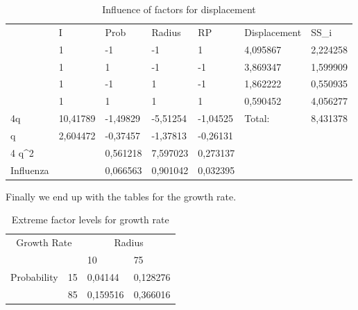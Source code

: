 \begin{table}[H]
\centering
\begin{tabular}{l|l|l|l|l|ll}
\cline{2-7}
 & I & Prob & Radius & RP & \multicolumn{1}{l|}{Displacement} & \multicolumn{1}{l|}{SS\_i} \\ \cline{2-7} 
 & 1 & -1 & -1 & 1 & \multicolumn{1}{l|}{4,095867} & \multicolumn{1}{l|}{2,224258} \\ \cline{2-7} 
 & 1 & 1 & -1 & -1 & \multicolumn{1}{l|}{3,869347} & \multicolumn{1}{l|}{1,599909} \\ \cline{2-7} 
 & 1 & -1 & 1 & -1 & \multicolumn{1}{l|}{1,862222} & \multicolumn{1}{l|}{0,550935} \\ \cline{2-7} 
 & 1 & 1 & 1 & 1 & \multicolumn{1}{l|}{0,590452} & \multicolumn{1}{l|}{4,056277} \\ \hline \multicolumn{1}{|l|}{4q} & 10,41789 & -1,49829 & -5,51254 & -1,04525 & \multicolumn{1}{l|}{Total:} & \multicolumn{1}{l|}{8,431378} \\ \hline
\multicolumn{1}{|l|}{q} & 2,604472 & -0,37457 & -1,37813 & -0,26131 &  &  \\ \cline{1-5}
\multicolumn{1}{|l|}{4 q\textasciicircum{}2} &  & 0,561218 & 7,597023 & 0,273137 &  &  \\ \cline{1-5}
\multicolumn{1}{|l|}{Influenza} &  & 0,066563 & 0,901042 & 0,032395 &  &  \\ \cline{1-5}
\end{tabular}
\caption{Influence of factors for displacement}
\end{table}

Finally we end up with the tables for the growth rate.

\begin{table}[H]
\centering
\begin{tabular}{|cl|ll|}
\hline
\multicolumn{2}{|c|}{\multirow{2}{*}{Growth Rate}} & \multicolumn{2}{c|}{Radius} \\ \cline{3-4} 
\multicolumn{2}{|c|}{} & \multicolumn{1}{l|}{10} & 75 \\ \hline
\multicolumn{1}{|c|}{\multirow{2}{*}{Probability}} & 15 & \multicolumn{1}{l|}{0,04144} & 0,128276 \\ \cline{2-4} 
\multicolumn{1}{|c|}{} & 85 & \multicolumn{1}{l|}{0,159516} & 0,366016 \\ \hline
\end{tabular}
\caption{Extreme factor levels for growth rate}
\end{table}

